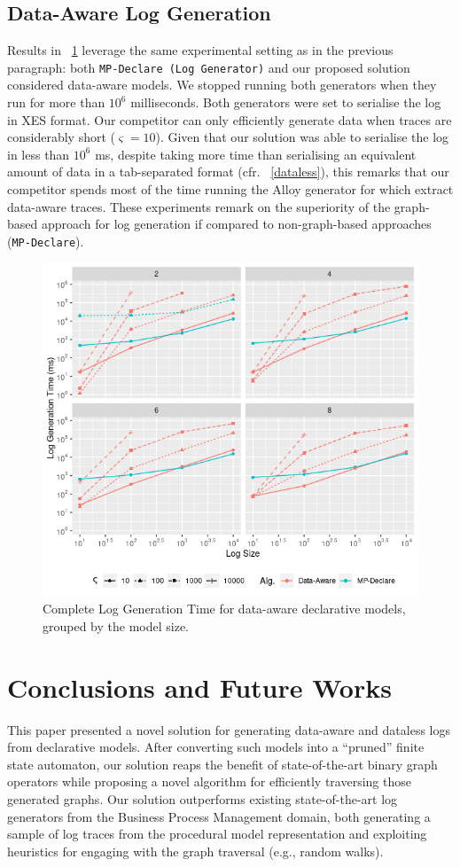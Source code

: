 \documentclass[acmengage]{acmart}
\begin{document}
\subsection{Data-Aware Log Generation}\label{ssec:dataaware}
Results in \figurename~\ref{dataware} leverage the same experimental setting as in the previous paragraph: both \texttt{MP-Declare (Log Generator)} and our proposed solution considered data-aware models. We stopped running both generators when they run for more than $10^6$ milliseconds. Both generators were set to serialise the log in XES format. Our competitor can only efficiently generate data when traces are considerably short ($\varsigma=10$). Given that our solution was able to serialise the log in less than $10^6$ ms, despite taking more time than serialising an equivalent amount of data in a tab-separated format (cfr. \figurename~\ref{dataless}), this remarks that our competitor spends most of the time running the Alloy generator for which extract data-aware traces. These experiments remark on the superiority of the graph-based approach for log generation if compared to non-graph-based approaches (\texttt{MP-Declare}).

\begin{figure}[!t]
\centering
\includegraphics[width=.9\linewidth]{fig/Datamer.png}
\caption{Complete Log Generation Time for data-aware declarative models, grouped by the model size.}\label{dataware}
\end{figure}
\section{Conclusions and Future Works}\label{sec:conclfut}
This paper presented a novel solution for generating data-aware and dataless logs from declarative models. After converting such models into a ``pruned'' finite state automaton, our solution reaps the benefit of state-of-the-art binary graph operators while proposing a novel algorithm for efficiently traversing those generated graphs. Our solution outperforms existing state-of-the-art log generators from the Business Process Management domain, both generating a sample of log traces from the procedural model representation and exploiting heuristics for engaging with the graph traversal (e.g., random walks).
\end{document}
